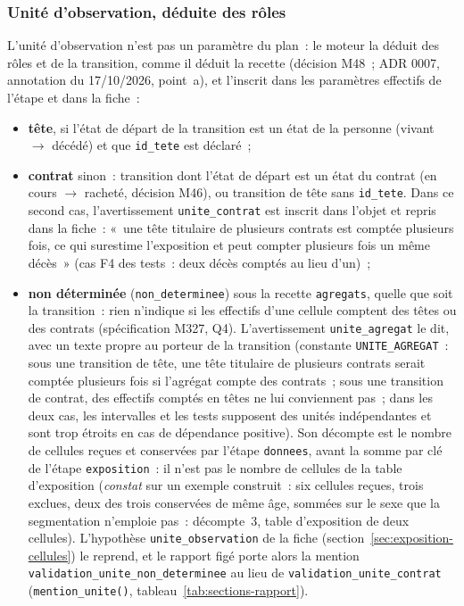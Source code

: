 \documentclass[a4paper,11pt]{article}
\newcommand{\code}[1]{\texttt{\small #1}}
\begin{document}
\subsubsection*{Unité d'observation, déduite des rôles}

L'unité d'observation n'est pas un paramètre du plan~: le moteur la déduit des
rôles et de la transition, comme il déduit la recette (décision M48~; ADR 0007,
annotation du 17/10/2026, point~a), et l'inscrit dans les paramètres effectifs
de l'étape et dans la fiche~:

\begin{itemize}[leftmargin=*, itemsep=2pt]
  \item \textbf{tête}, si l'état de départ de la transition est un état de la
    personne (vivant $\to$ décédé) et que \code{id\_tete} est déclaré~;
  \item \textbf{contrat} sinon~: transition dont l'état de départ est un état du
    contrat (en cours $\to$ racheté, décision M46), ou transition de tête sans
    \code{id\_tete}. Dans ce second cas, l'avertissement \code{unite\_contrat}
    est inscrit dans l'objet et repris dans la fiche~: «~une tête titulaire de
    plusieurs contrats est comptée plusieurs fois, ce qui surestime
    l'exposition et peut compter plusieurs fois un même décès~» (cas F4 des
    tests~: deux décès comptés au lieu d'un)~;
  \item \textbf{non déterminée} (\code{non\_determinee}) sous la recette
    \code{agregats}, quelle que soit la transition~: rien n'indique si les
    effectifs d'une cellule comptent des têtes ou des contrats (spécification
    M327, Q4). L'avertissement \code{unite\_agregat} le dit, avec un texte
    propre au porteur de la transition (constante \code{UNITE\_AGREGAT}~:
    sous une transition de tête, une tête titulaire de plusieurs contrats
    serait comptée plusieurs fois si l'agrégat compte des contrats~; sous une
    transition de contrat, des effectifs comptés en têtes ne lui conviennent
    pas~; dans les deux cas, les intervalles et les tests supposent des unités
    indépendantes et sont trop étroits en cas de dépendance positive). Son
    décompte est le nombre de cellules reçues et conservées par l'étape
    \code{donnees}, avant la somme par clé de l'étape \code{exposition}~: il
    n'est pas le nombre de cellules de la table d'exposition (\emph{constat} sur
    un exemple construit~: six cellules reçues, trois exclues, deux des
    trois conservées de même âge, sommées sur le sexe que la segmentation
    n'emploie pas~: décompte~3, table d'exposition de deux cellules).
    L'hypothèse \code{unite\_observation} de la fiche
    (section~\ref{sec:exposition-cellules}) le reprend, et le rapport figé
    porte alors la mention \code{validation\_unite\_non\_determinee} au
    lieu de \code{validation\_unite\_contrat} (\code{mention\_unite()},
    tableau~\ref{tab:sections-rapport}).
\end{itemize}
\end{document}
